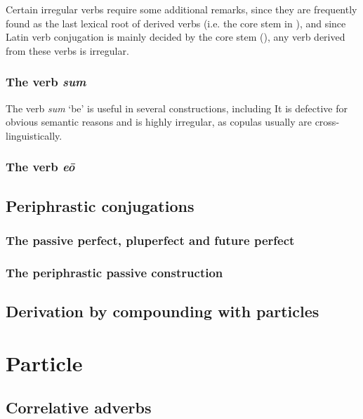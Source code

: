 \documentclass{article}
\newcommand*{\corpus}[1]{\emph{#1}}
\begin{document}
Certain irregular verbs require some additional remarks,
since they are frequently found as the last lexical root of derived verbs 
(i.e. the core stem in ),
and since Latin verb conjugation is mainly decided by the core stem (),
any verb derived from these verbs is irregular.

\subsubsection{The verb \corpus{sum}}\label{sec:sum-verb}

The verb \corpus{sum} `be' is useful in several constructions,
including %
It is defective for obvious semantic reasons
and is highly irregular,
as copulas usually are cross-linguistically.

\subsubsection{The verb \corpus{e\={o}}}

\subsection{Periphrastic conjugations}

\subsubsection{The passive perfect, pluperfect and future perfect}

\subsubsection{The periphrastic passive construction}\label{sec:passive-periphrastic}

\subsection{Derivation by compounding with particles}

\section{Particle}

\subsection{Correlative adverbs}\label{sec:correlative-advs}
\end{document}
